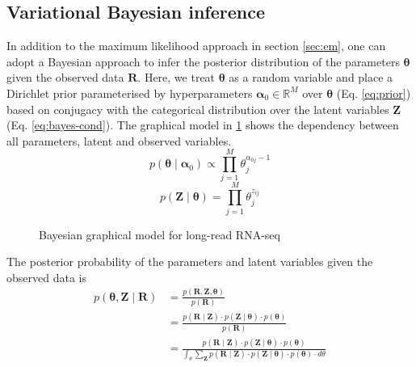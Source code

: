 \subsection{Variational Bayesian inference}

In addition to the maximum likelihood approach in section \ref{sec:em}, one can adopt a Bayesian approach to infer the posterior distribution of the parameters $\bm\theta$ given the observed data $\bm{R}$. Here, we treat $\bm\theta$ as a random variable and place a Dirichlet prior parameterised by hyperparameters $\bm\alpha_0\in\mathbb{R}^{M}$ over $\bm{\theta}$ (Eq. \ref{eq:prior}) based on conjugacy with the categorical distribution over the latent variables $\bm{Z}$  (Eq. \ref{eq:bayes-cond}). The graphical model in \ref{fig:graphical-model-2} shows the dependency between all parameters, latent and observed variables.  
\begin{equation}\label{eq:prior}
    p(\bm\theta\mid\bm\alpha_0)\propto \prod_{j=1}^M \theta_j^{\alpha_{0j}-1}
\end{equation}
\begin{equation}\label{eq:bayes-cond}
    p(\bm{Z}\mid\bm\theta)=\prod_{j=1}^M\theta_j^{z_{ij}}
\end{equation}
\begin{figure}[H]
    \centering
    \caption{Bayesian graphical model for long-read RNA-seq}
    \label{fig:graphical-model-2}
\end{figure}
\noindent The posterior probability of the parameters and latent variables given the observed data is 
\begin{equation}\label{eq:post-full}
\begin{split}
    p(\bm{\theta},\bm{Z}\mid\bm{R}) & =\frac{p(\bm{R},\bm{Z},\bm{\theta})}{p(\bm{R})} \\
    & = \frac{p(\bm{R}\mid\bm{Z})\cdot p(\bm{Z}\mid\bm{\theta})\cdot p(\bm{\theta})}{p(\bm{R})} \\
    & = \frac{p(\bm{R}\mid\bm{Z})\cdot p(\bm{Z}\mid\bm{\theta})\cdot p(\bm{\theta})}{\int_\theta \sum_{\bm{Z}} p(\bm{R}\mid\bm{Z})\cdot p(\bm{Z}\mid\bm{\theta})\cdot p(\bm{\theta})\cdot d\theta}
\end{split}
\end{equation}
